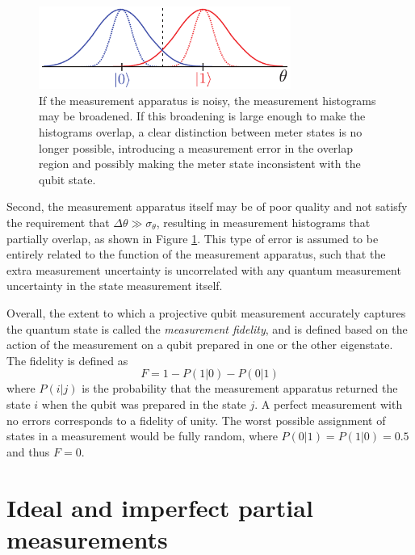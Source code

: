 \begin{figure}
\begin{center}
	\includegraphics[width = 3.25in]{qmeas_chapter/proj_meas_noise}
\end{center}
\caption[Projective measurement error due to noise]{If the measurement apparatus is noisy, the measurement histograms may be broadened.  If this broadening is large enough to make the histograms overlap, a clear distinction between meter states is no longer possible, introducing a measurement error in the overlap region and possibly making the meter state inconsistent with the qubit state.}
\label{fig:proj_meas_noise}
\end{figure}

Second, the measurement apparatus itself may be of poor quality and not satisfy the requirement that $\Delta \theta \gg \sigma_\theta$, resulting in measurement histograms that partially overlap, as shown in Figure \ref{fig:proj_meas_noise}.  This type of error is assumed to be entirely related to the function of the measurement apparatus, such that the extra measurement uncertainty is uncorrelated with any quantum measurement uncertainty in the state measurement itself.

Overall, the extent to which a projective qubit measurement accurately captures the quantum state is called the \textit{measurement fidelity}, and is defined based on the action of the measurement on a qubit prepared in one or the other eigenstate.  The fidelity is defined as
\begin{equation}
F = 1 - P(1|0) - P(0|1)
\label{eq:ro_fid}
\end{equation}
where $P(i|j)$ is the probability that the measurement apparatus returned the state $i$ when the qubit was prepared in the state $j$.  A perfect measurement with no errors corresponds to a fidelity of unity.  The worst possible assignment of states in a measurement would be fully random, where $P(0|1) = P(1|0) = 0.5$ and thus $F = 0$.

\section{Ideal and imperfect partial measurements}

